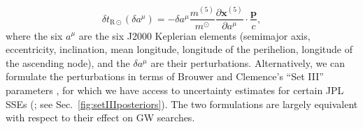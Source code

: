 \documentclass[reprint,
 amsmath,amssymb,
 aps,prd,floatfix,
]{revtex4-1}
\begin{document}
\begin{itemize}[leftmargin=*]
\begin{equation}
\label{eq:orbitperturb}
    \delta t_{\mathrm{R}\odot}(\delta a^\mu) = -\delta a^\mu
    \frac{m^{(5)}}{m^\odot} \frac{\partial \mathbf{x}^{(5)}}{\partial a^\mu} \cdot \frac{\mathbf{p}}{c},
\end{equation}
%
where the six $a^\mu$ are the six J2000 Keplerian elements (semimajor axis, eccentricity, inclination, mean longitude, longitude of the perihelion, longitude of the ascending node), and the $\delta a^\mu$ are their perturbations. Alternatively, we can formulate the perturbations in terms of Brouwer and Clemence's ``Set III'' parameters \cite{1961mcm..book.....B}, for which we have access to uncertainty estimates for certain JPL SSEs (\cite{de434,de438}; see Sec.\ \ref{fig:setIIIposteriors}). The two formulations are largely equivalent with respect to their effect on GW searches.


\end{itemize}
\end{document}
